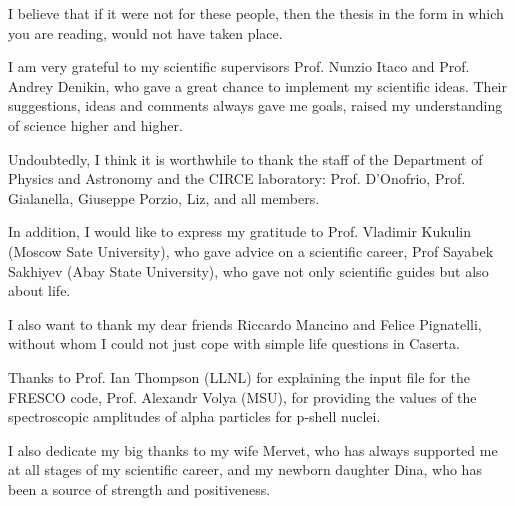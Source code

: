\documentclass[
12pt, %
oneside, %
english, %
onehalfspacing, %
onehalfspacing, %
headsepline, %
]{MastersDoctoralThesis} %
\begin{document}
\begin{acknowledgements}
\addchaptertocentry{\acknowledgementname} %
I believe that if it were not for these people, then the thesis in the form in which you are reading, would not have taken place.

I am very grateful to my scientific supervisors Prof. Nunzio Itaco and Prof. Andrey Denikin, who gave a great chance to implement my scientific ideas. Their suggestions, ideas and comments always gave me goals, raised my understanding of science higher and higher.

Undoubtedly, I think it is worthwhile to thank the staff of the Department of Physics and Astronomy and the CIRCE laboratory: Prof. D'Onofrio, Prof. Gialanella, Giuseppe Porzio, Liz, and all members.

In addition, I would like to express my gratitude to Prof. Vladimir Kukulin (Moscow Sate University), who gave advice on a scientific career, Prof Sayabek Sakhiyev (Abay State University), who gave not only scientific guides but also about life.

I also want to thank my dear friends Riccardo Mancino and Felice Pignatelli, without whom I could not just cope with simple life questions in Caserta.

Thanks to Prof. Ian Thompson (LLNL) for explaining the input file for the FRESCO code, Prof. Alexandr Volya (MSU), for providing the values of the spectroscopic amplitudes of alpha particles for p-shell nuclei.

I also dedicate my big thanks to my wife Mervet, who has always supported me at all stages of my scientific career, and my newborn daughter Dina, who has been a source of strength and positiveness.
\end{acknowledgements}


\tableofcontents %

\listoffigures %

\listoftables %

\end{document}
